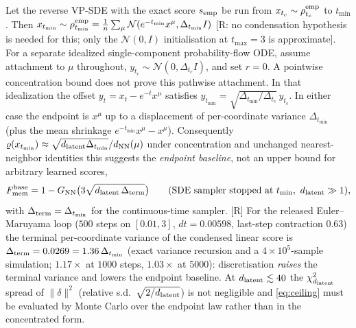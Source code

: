 \begin{lemma}\label{lem:endpoint}
Let the reverse VP-SDE with the exact score $s_{\rm emp}$ be run from $x_{t_c}\sim\rho^{\rm emp}_{t_c}$ to $t_{\min}$. Then $x_{t_{\min}}\sim\rho^{\rm emp}_{t_{\min}}=\frac1{n}\sum_\mu\mathcal N(e^{-t_{\min}}x^\mu,\Delta_{t_{\min}}I)$ [R: no condensation hypothesis is needed for this; only the $\mathcal N(0,I)$ initialisation at $t_{\max}=3$ is approximate]. For a separate idealized single-component probability-flow ODE, assume attachment to $\mu$ throughout, $y_{t_c}\sim\mathcal N(0,\Delta_{t_c}I)$, and set $r=0$. A pointwise concentration bound does not prove this pathwise attachment. In that idealization the offset $y_t=x_t-e^{-t}x^\mu$ satisfies $y_{t_{\min}}=\sqrt{\Delta_{t_{\min}}/\Delta_{t_c}}\,y_{t_c}$. In either case the endpoint is $x^\mu$ up to a displacement of per-coordinate variance $\Delta_{t_{\min}}$ (plus the mean shrinkage $e^{-t_{\min}}x^\mu-x^\mu$). Consequently $\varrho(x_{t_{\min}})\approx\sqrt{d_{\mathrm{latent}}\Delta_{t_{\min}}}/d_{\rm NN}(\mu)$ under concentration and unchanged nearest-neighbor identities this suggests the \emph{endpoint baseline}, not an upper bound for arbitrary learned scores,
\begin{equation}\label{eq:ceiling}
 F^{\rm base}_{\rm mem}=1-G_{\rm NN}\big(3\sqrt{\dlat\,\Delta_{\rm term}}\big)\qquad(\text{SDE sampler stopped at }t_{\min},\ \dlat\gg1),
\end{equation}
with $\Delta_{\rm term}=\Delta_{t_{\min}}$ for the continuous-time sampler. [R] For the released Euler--Maruyama loop ($500$ steps on $[0.01,3]$, $dt=0.00598$, last-step contraction $0.63$) the terminal per-coordinate variance of the condensed linear score is $\Delta_{\rm term}=0.0269=1.36\,\Delta_{t_{\min}}$ (exact variance recursion and a $4\times10^5$-sample simulation; $1.17\times$ at $1000$ steps, $1.03\times$ at $5000$): discretisation \emph{raises} the terminal variance and lowers the endpoint baseline. At $d_{\mathrm{latent}}\lesssim40$ the $\chi^2_{d_{\mathrm{latent}}}$ spread of $\|\delta\|^2$ (relative s.d.\ $\sqrt{2/d_{\mathrm{latent}}}$) is not negligible and \eqref{eq:ceiling} must be evaluated by Monte Carlo over the endpoint law rather than in the concentrated form.
\end{lemma}
